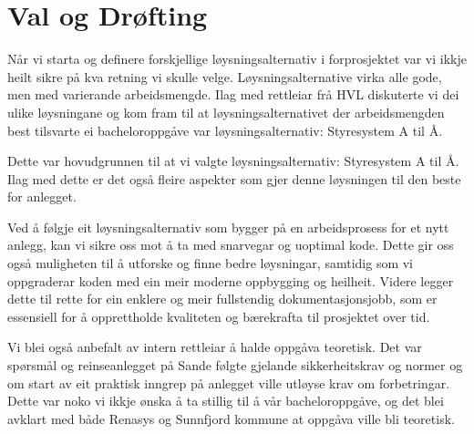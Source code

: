 \newpage
\section{Val og Drøfting}

Når vi starta og definere forskjellige løysningsalternativ i forprosjektet var vi
ikkje heilt sikre på kva retning vi skulle velge. Løysningsalternative virka alle gode,
men med varierande arbeidsmengde. Ilag med rettleiar frå HVL 
diskuterte vi dei ulike løysningane og kom fram til at løysningsalternativet der arbeidsmengden best
tilsvarte ei bacheloroppgåve var løysningsalternativ: Styresystem A til Å.

Dette var hovudgrunnen til at vi valgte løysningsalternativ: Styresystem A til Å.
Ilag med dette er det også fleire aspekter som gjer denne løysningen til den beste for anlegget.

Ved å følgje eit løysningsalternativ som bygger på en arbeidsprosess for et nytt anlegg, 
kan vi sikre oss mot å ta med snarvegar og uoptimal kode. 
Dette gir oss også muligheten til å utforske og finne bedre løysningar, 
samtidig som vi oppgraderar koden med ein meir moderne oppbygging og heilheit.
Videre legger dette til rette for ein enklere og meir fullstendig dokumentasjonsjobb, 
som er essensiell for å opprettholde kvaliteten og bærekrafta til prosjektet over tid.

Vi blei også anbefalt av intern rettleiar å halde oppgåva teoretisk.
Det var spørsmål og reinseanlegget på Sande følgte gjelande sikkerheitskrav og normer
og om start av eit praktisk inngrep på anlegget ville utløyse krav om forbetringar.
Dette var noko vi ikkje ønska å ta stillig til å vår bacheloroppgåve, og det blei avklart
med både Renasys og Sunnfjord kommune at oppgåva ville bli teoretisk.
